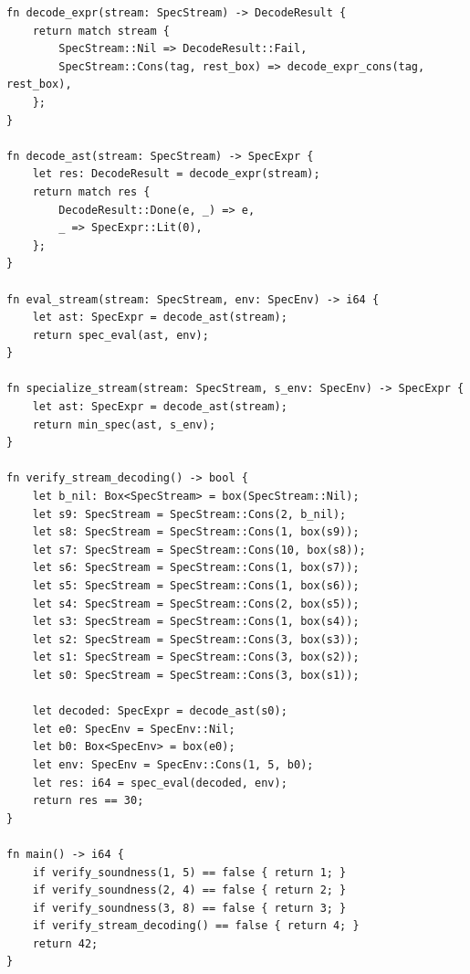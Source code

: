 \begin{lstlisting}[language=NumLang, caption={Full Annotated Source of the NumLang Self-Applicable Specializer (\texttt{src/stdlib/minspec.nl}).}, label={lst:minspec_nl_full}]
fn decode_expr(stream: SpecStream) -> DecodeResult {
    return match stream {
        SpecStream::Nil => DecodeResult::Fail,
        SpecStream::Cons(tag, rest_box) => decode_expr_cons(tag, rest_box),
    };
}

fn decode_ast(stream: SpecStream) -> SpecExpr {
    let res: DecodeResult = decode_expr(stream);
    return match res {
        DecodeResult::Done(e, _) => e,
        _ => SpecExpr::Lit(0),
    };
}

fn eval_stream(stream: SpecStream, env: SpecEnv) -> i64 {
    let ast: SpecExpr = decode_ast(stream);
    return spec_eval(ast, env);
}

fn specialize_stream(stream: SpecStream, s_env: SpecEnv) -> SpecExpr {
    let ast: SpecExpr = decode_ast(stream);
    return min_spec(ast, s_env);
}

fn verify_stream_decoding() -> bool {
    let b_nil: Box<SpecStream> = box(SpecStream::Nil);
    let s9: SpecStream = SpecStream::Cons(2, b_nil);
    let s8: SpecStream = SpecStream::Cons(1, box(s9));
    let s7: SpecStream = SpecStream::Cons(10, box(s8));
    let s6: SpecStream = SpecStream::Cons(1, box(s7));
    let s5: SpecStream = SpecStream::Cons(1, box(s6));
    let s4: SpecStream = SpecStream::Cons(2, box(s5));
    let s3: SpecStream = SpecStream::Cons(1, box(s4));
    let s2: SpecStream = SpecStream::Cons(3, box(s3));
    let s1: SpecStream = SpecStream::Cons(3, box(s2));
    let s0: SpecStream = SpecStream::Cons(3, box(s1));

    let decoded: SpecExpr = decode_ast(s0);
    let e0: SpecEnv = SpecEnv::Nil;
    let b0: Box<SpecEnv> = box(e0);
    let env: SpecEnv = SpecEnv::Cons(1, 5, b0);
    let res: i64 = spec_eval(decoded, env);
    return res == 30;
}

fn main() -> i64 {
    if verify_soundness(1, 5) == false { return 1; }
    if verify_soundness(2, 4) == false { return 2; }
    if verify_soundness(3, 8) == false { return 3; }
    if verify_stream_decoding() == false { return 4; }
    return 42;
}

\end{lstlisting}
